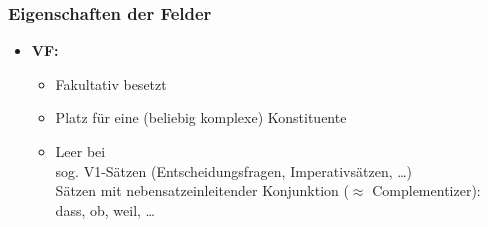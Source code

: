 \begin{frame}
\frametitle{Eigenschaften der Felder}

\begin{itemize}
	\item \textbf{VF:}
	\begin{itemize}
		\item Fakultativ besetzt
		\item Platz für eine (beliebig komplexe) Konstituente 
		\item Leer bei \\
		sog. V1-Sätzen (Entscheidungsfragen, Imperativsätzen, \dots ) \\
		Sätzen mit nebensatzeinleitender Konjunktion ($\approx$ Complementizer): dass, ob, weil, \dots \\
	\end{itemize}

\begin{table}
\centering
{}
\end{table}

\end{itemize}

\end{frame}


